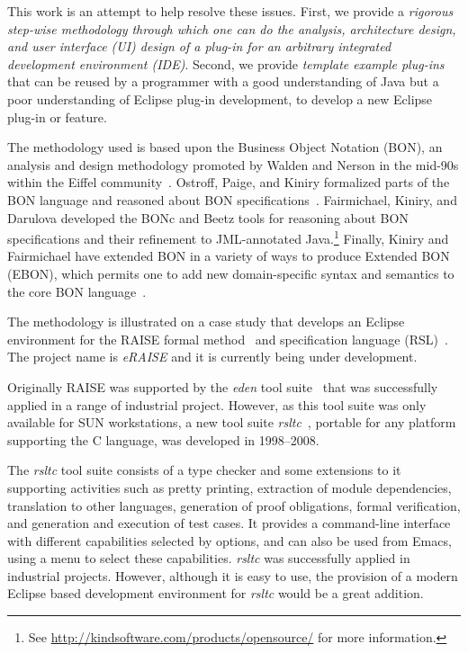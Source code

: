 \documentclass[conference]{IEEEtran}
\begin{document}
This work is an attempt to help resolve these issues.  First, we
provide a \emph{rigorous step-wise methodology through which one can
  do the analysis, architecture design, and user interface (UI) design of a plug-in for
  an arbitrary integrated development environment (IDE)}.  Second, we provide \emph{template example
  plug-ins} that can be reused by a programmer with a good
understanding of Java but a poor understanding of Eclipse plug-in
development, to develop a new Eclipse plug-in or feature.

The methodology used is based upon the Business Object Notation (BON),
an analysis and design methodology promoted by Walden and Nerson in
the mid-90s within the Eiffel community~\cite{WaldenNerson95}.
Ostroff, Paige, and Kiniry formalized parts of the BON language and
reasoned about BON
specifications~\cite{LancaricOstroffPaige02,EBON01,PaigeEtal02,PaigeOstroff01b}.
Fairmichael, Kiniry, and Darulova developed the BONc and Beetz tools
for reasoning about BON specifications and their refinement to
JML-annotated Java.\footnote{See
  \url{http://kindsoftware.com/products/opensource/} for more
  information.}  Finally, Kiniry and Fairmichael have extended BON in
a variety of ways to produce Extended BON (EBON), which permits one to
add new domain-specific syntax and semantics to the core BON
language~\cite{Kiniry02-PhDThesis}.

The methodology is illustrated on a case study that develops an
Eclipse environment for the RAISE formal method~\cite{RMG95} and
specification language (RSL)~\cite{RLG92}. The project name is
\emph{eRAISE} and it is currently being under development.

Originally RAISE was supported by the \emph{eden} tool
suite~\cite{edenReferenceManual} that was successfully applied in a
range of industrial project.  However, as this tool suite was only
available for SUN workstations, a new tool suite
\emph{rsltc}~\cite{rsltcUserGuide,RAISETools2003}, portable for any
platform supporting the C language, was developed in 1998--2008. 

The \emph{rsltc} tool suite consists of a type checker and some
extensions to it supporting activities such as pretty printing,
extraction of module dependencies, translation to other languages,
generation of proof obligations, formal verification, and generation
and execution of test cases. It provides a command-line interface with
different capabilities selected by options, and can also be used from
Emacs, using a menu to select these capabilities.  \emph{rsltc} was
successfully applied in industrial projects. However, although it is
easy to use, the provision of a modern Eclipse based development
environment for \emph{rsltc} would be a great addition.
\end{document}
